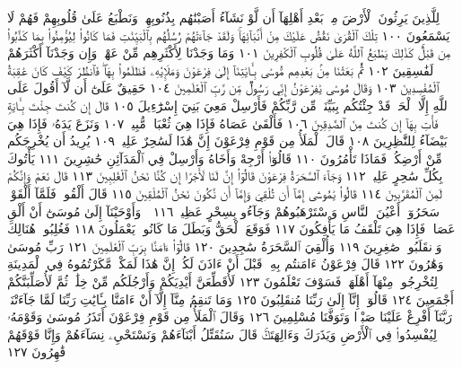 لِلَّذِينَ يَرِثُونَ ٱلْأَرْضَ مِنۢ بَعْدِ أَهْلِهَآ أَن لَّوْ نَشَآءُ
أَصَبْنَٰهُم بِذُنُوبِهِمْۚ وَنَطْبَعُ عَلَىٰ قُلُوبِهِمْ فَهُمْ لَا يَسْمَعُونَ ١٠٠
تِلْكَ ٱلْقُرَىٰ نَقُصُّ عَلَيْكَ مِنْ أَنۢبَآئِهَاۚ وَلَقَدْ جَآءَتْهُمْ
رُسُلُهُم بِٱلْبَيِّنَٰتِ فَمَا كَانُوا۟ لِيُؤْمِنُوا۟ بِمَا كَذَّبُوا۟ مِن
قَبْلُۚ كَذَٰلِكَ يَطْبَعُ ٱللَّهُ عَلَىٰ قُلُوبِ ٱلْكَٰفِرِينَ ١٠١ وَمَا وَجَدْنَا
لِأَكْثَرِهِم مِّنْ عَهْدࣲۖ وَإِن وَجَدْنَآ أَكْثَرَهُمْ لَفَٰسِقِينَ ١٠٢
ثُمَّ بَعَثْنَا مِنۢ بَعْدِهِم مُّوسَىٰ بِـَٔايَٰتِنَآ إِلَىٰ فِرْعَوْنَ وَمَلَإِي۟هِۦ
فَظَلَمُوا۟ بِهَاۖ فَٱنظُرْ كَيْفَ كَانَ عَٰقِبَةُ ٱلْمُفْسِدِينَ ١٠٣
وَقَالَ مُوسَىٰ يَٰفِرْعَوْنُ إِنِّي رَسُولࣱ مِّن رَّبِّ ٱلْعَٰلَمِينَ ١٠٤
حَقِيقٌ عَلَىٰٓ أَن لَّآ أَقُولَ عَلَى ٱللَّهِ إِلَّا ٱلْحَقَّۚ قَدْ جِئْتُكُم بِبَيِّنَةࣲ
مِّن رَّبِّكُمْ فَأَرْسِلْ مَعِيَ بَنِيٓ إِسْرَٰٓءِيلَ ١٠٥ قَالَ إِن كُنتَ
جِئْتَ بِـَٔايَةࣲ فَأْتِ بِهَآ إِن كُنتَ مِنَ ٱلصَّٰدِقِينَ ١٠٦ فَأَلْقَىٰ
عَصَاهُ فَإِذَا هِيَ ثُعْبَانࣱ مُّبِينࣱ ١٠٧ وَنَزَعَ يَدَهُۥ فَإِذَا هِيَ بَيْضَآءُ
لِلنَّٰظِرِينَ ١٠٨ قَالَ ٱلْمَلَأُ مِن قَوْمِ فِرْعَوْنَ إِنَّ هَٰذَا لَسَٰحِرٌ
عَلِيمࣱ ١٠٩ يُرِيدُ أَن يُخْرِجَكُم مِّنْ أَرْضِكُمْۖ فَمَاذَا تَأْمُرُونَ ١١٠
قَالُوٓا۟ أَرْجِهْ وَأَخَاهُ وَأَرْسِلْ فِي ٱلْمَدَآئِنِ حَٰشِرِينَ ١١١ يَأْتُوكَ
بِكُلِّ سَٰحِرٍ عَلِيمࣲ ١١٢ وَجَآءَ ٱلسَّحَرَةُ فِرْعَوْنَ قَالُوٓا۟ إِنَّ
لَنَا لَأَجْرًا إِن كُنَّا نَحْنُ ٱلْغَٰلِبِينَ ١١٣ قَالَ نَعَمْ وَإِنَّكُمْ
لَمِنَ ٱلْمُقَرَّبِينَ ١١٤ قَالُوا۟ يَٰمُوسَىٰٓ إِمَّآ أَن تُلْقِيَ وَإِمَّآ أَن
نَّكُونَ نَحْنُ ٱلْمُلْقِينَ ١١٥ قَالَ أَلْقُوا۟ۖ فَلَمَّآ أَلْقَوْا۟ سَحَرُوٓا۟
أَعْيُنَ ٱلنَّاسِ وَٱسْتَرْهَبُوهُمْ وَجَآءُو بِسِحْرٍ عَظِيمࣲ ١١٦
۞ وَأَوْحَيْنَآ إِلَىٰ مُوسَىٰٓ أَنْ أَلْقِ عَصَاكَۖ فَإِذَا هِيَ تَلْقَفُ مَا يَأْفِكُونَ ١١٧
فَوَقَعَ ٱلْحَقُّ وَبَطَلَ مَا كَانُوا۟ يَعْمَلُونَ ١١٨ فَغُلِبُوا۟
هُنَالِكَ وَٱنقَلَبُوا۟ صَٰغِرِينَ ١١٩ وَأُلْقِيَ ٱلسَّحَرَةُ سَٰجِدِينَ ١٢٠
قَالُوٓا۟ ءَامَنَّا بِرَبِّ ٱلْعَٰلَمِينَ ١٢١ رَبِّ مُوسَىٰ وَهَٰرُونَ ١٢٢ قَالَ
فِرْعَوْنُ ءَامَنتُم بِهِۦ قَبْلَ أَنْ ءَاذَنَ لَكُمْۖ إِنَّ هَٰذَا لَمَكْرࣱ
مَّكَرْتُمُوهُ فِي ٱلْمَدِينَةِ لِتُخْرِجُوا۟ مِنْهَآ أَهْلَهَاۖ فَسَوْفَ تَعْلَمُونَ ١٢٣
لَأُقَطِّعَنَّ أَيْدِيَكُمْ وَأَرْجُلَكُم مِّنْ خِلَٰفࣲ ثُمَّ لَأُصَلِّبَنَّكُمْ
أَجْمَعِينَ ١٢٤ قَالُوٓا۟ إِنَّآ إِلَىٰ رَبِّنَا مُنقَلِبُونَ ١٢٥ وَمَا تَنقِمُ مِنَّآ
إِلَّآ أَنْ ءَامَنَّا بِـَٔايَٰتِ رَبِّنَا لَمَّا جَآءَتْنَاۚ رَبَّنَآ أَفْرِغْ عَلَيْنَا صَبْرࣰا
وَتَوَفَّنَا مُسْلِمِينَ ١٢٦ وَقَالَ ٱلْمَلَأُ مِن قَوْمِ فِرْعَوْنَ أَتَذَرُ مُوسَىٰ
وَقَوْمَهُۥ لِيُفْسِدُوا۟ فِي ٱلْأَرْضِ وَيَذَرَكَ وَءَالِهَتَكَۚ قَالَ سَنُقَتِّلُ
أَبْنَآءَهُمْ وَنَسْتَحْيِۦ نِسَآءَهُمْ وَإِنَّا فَوْقَهُمْ قَٰهِرُونَ ١٢٧
